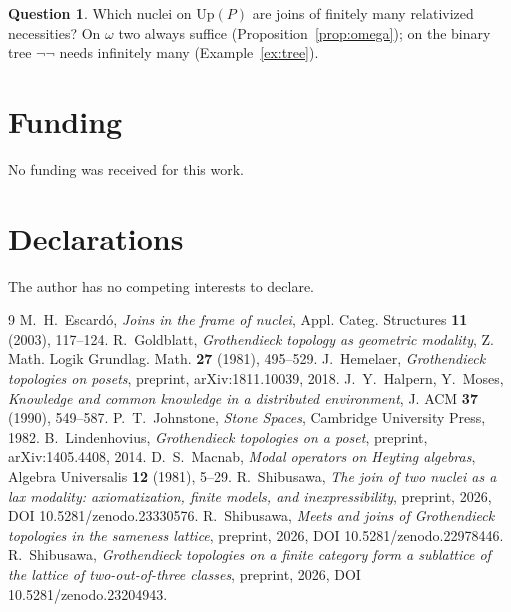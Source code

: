 \documentclass[11pt]{amsart}
\theoremstyle{definition}
\newtheorem{que}[thm]{Question}
\newcommand{\Up}{\mathrm{Up}}
\begin{document}
\begin{que}
Which nuclei on $\Up(P)$ are joins of finitely many relativized necessities?
On $\omega$ two always suffice (Proposition~\ref{prop:omega}); on the binary
tree $\neg\neg$ needs infinitely many (Example~\ref{ex:tree}).
\end{que}

\section*{Funding}
No funding was received for this work.

\section*{Declarations}
The author has no competing interests to declare.

\begin{thebibliography}{9}
 M.~H.~Escard\'o, \emph{Joins in the frame of nuclei}, Appl.
Categ. Structures \textbf{11} (2003), 117--124.
 R.~Goldblatt, \emph{Grothendieck topology as geometric
modality}, Z. Math. Logik Grundlag. Math. \textbf{27} (1981), 495--529.
 J.~Hemelaer, \emph{Grothendieck topologies on posets},
preprint, arXiv:1811.10039, 2018.
 J.~Y.~Halpern, Y.~Moses, \emph{Knowledge and common knowledge in a
distributed environment}, J. ACM \textbf{37} (1990), 549--587.
 P.~T.~Johnstone, \emph{Stone Spaces}, Cambridge University
Press, 1982.
 B.~Lindenhovius, \emph{Grothendieck topologies on a
poset}, preprint, arXiv:1405.4408, 2014.
 D.~S.~Macnab, \emph{Modal operators on Heyting algebras},
Algebra Universalis \textbf{12} (1981), 5--29.
 R.~Shibusawa, \emph{The join of two nuclei as a lax modality:
axiomatization, finite models, and inexpressibility}, preprint, 2026,
DOI 10.5281/zenodo.23330576.
 R.~Shibusawa, \emph{Meets and joins of Grothendieck
topologies in the sameness lattice}, preprint, 2026, DOI 10.5281/zenodo.22978446.
 R.~Shibusawa, \emph{Grothendieck topologies on a finite
category form a sublattice of the lattice of two-out-of-three classes},
preprint, 2026, DOI 10.5281/zenodo.23204943.
\end{thebibliography}
\end{document}
